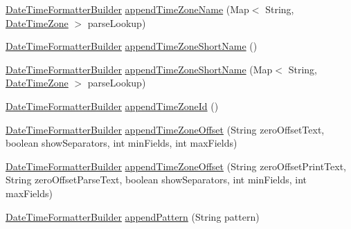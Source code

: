 \begin{DoxyCompactItemize}
\item 
\hyperlink{classorg_1_1joda_1_1time_1_1format_1_1_date_time_formatter_builder}{Date\-Time\-Formatter\-Builder} \hyperlink{classorg_1_1joda_1_1time_1_1format_1_1_date_time_formatter_builder_a846288359d7d366a39e860238131faa2}{append\-Time\-Zone\-Name} (Map$<$ String, \hyperlink{classorg_1_1joda_1_1time_1_1_date_time_zone}{Date\-Time\-Zone} $>$ parse\-Lookup)
\item 
\hyperlink{classorg_1_1joda_1_1time_1_1format_1_1_date_time_formatter_builder}{Date\-Time\-Formatter\-Builder} \hyperlink{classorg_1_1joda_1_1time_1_1format_1_1_date_time_formatter_builder_a9e71bf6d6befcb6e64894864a2625f2b}{append\-Time\-Zone\-Short\-Name} ()
\item 
\hyperlink{classorg_1_1joda_1_1time_1_1format_1_1_date_time_formatter_builder}{Date\-Time\-Formatter\-Builder} \hyperlink{classorg_1_1joda_1_1time_1_1format_1_1_date_time_formatter_builder_a590be8757aa63b32aa14bd64e7739e38}{append\-Time\-Zone\-Short\-Name} (Map$<$ String, \hyperlink{classorg_1_1joda_1_1time_1_1_date_time_zone}{Date\-Time\-Zone} $>$ parse\-Lookup)
\item 
\hyperlink{classorg_1_1joda_1_1time_1_1format_1_1_date_time_formatter_builder}{Date\-Time\-Formatter\-Builder} \hyperlink{classorg_1_1joda_1_1time_1_1format_1_1_date_time_formatter_builder_a1a1f71e8aec9f25253251c80008a9e3d}{append\-Time\-Zone\-Id} ()
\item 
\hyperlink{classorg_1_1joda_1_1time_1_1format_1_1_date_time_formatter_builder}{Date\-Time\-Formatter\-Builder} \hyperlink{classorg_1_1joda_1_1time_1_1format_1_1_date_time_formatter_builder_a369fadb97abc0ef645fa29145b32f181}{append\-Time\-Zone\-Offset} (String zero\-Offset\-Text, boolean show\-Separators, int min\-Fields, int max\-Fields)
\item 
\hyperlink{classorg_1_1joda_1_1time_1_1format_1_1_date_time_formatter_builder}{Date\-Time\-Formatter\-Builder} \hyperlink{classorg_1_1joda_1_1time_1_1format_1_1_date_time_formatter_builder_accf8375cd5d2ca809c47d7c5afb03d1d}{append\-Time\-Zone\-Offset} (String zero\-Offset\-Print\-Text, String zero\-Offset\-Parse\-Text, boolean show\-Separators, int min\-Fields, int max\-Fields)
\item 
\hyperlink{classorg_1_1joda_1_1time_1_1format_1_1_date_time_formatter_builder}{Date\-Time\-Formatter\-Builder} \hyperlink{classorg_1_1joda_1_1time_1_1format_1_1_date_time_formatter_builder_a4a0592cffe558732865b16c846872dfd}{append\-Pattern} (String pattern)
\end{DoxyCompactItemize}


